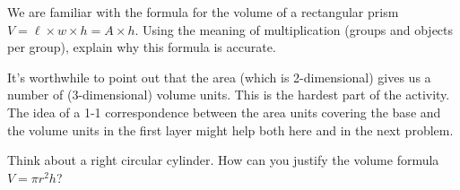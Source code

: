 \documentclass{ximera}
\begin{document}
\begin{problem}
We are familiar with the formula for the volume of a rectangular prism $V = \ell \times w \times h = A \times h$.  Using the meaning of multiplication (groups and objects per group), explain why this formula is accurate.

\begin{instructorNotes}
It's worthwhile to point out that the area (which is 2-dimensional) gives us a number of (3-dimensional) volume units.  This is the hardest part of the activity.  The idea of a 1-1 correspondence between the area units covering the base and the volume units in the first layer might help both here and in the next problem.
\end{instructorNotes}
\end{problem}

\begin{problem} 
Think about a right circular cylinder.  How can you justify the volume formula $V = \pi r^2 h$?


\end{problem}
\end{document}
